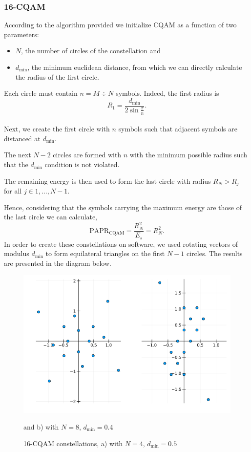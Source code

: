 \documentclass[11pt,a4paper,onecolumn,final]{article}
\newcommand{\dmin}{d_\text{min}}
\begin{document}
\subsubsection*{16-CQAM}
According to the algorithm provided \cite{cqam} we initialize CQAM as a function of two parameters: 
\begin{itemize}
    \item \(N\), the number of circles of the constellation and
    \item \(d_\text{min}\), the minimum euclidean distance, from which we can directly calculate the radius of the first circle. 
\end{itemize}
Each circle must contain \(n = M \div N \) symbols. Indeed, the first radius is 
\begin{equation}
    R_1 = \frac{d_\text{min} }{2\sin \frac{\pi}{ n}}.
\end{equation}\\ 
Next, we create the first circle with \(n \) symbols such that adjacent symbols are distanced at \(d_\text{min}\). 

The next \(N-2\) circles are formed with \(n\) with the minimum possible radius such that the \(d_\text{min}\) condition is not violated. 

The remaining energy is then used to form the last circle with radius \(R_N > R_j\) \\ for all \(j \in 1,\ldots , N-1\).

Hence, considering that the symbols carrying the maximum energy are those of the last circle we can calculate,  
\begin{equation}
    \text{PAPR}_\text{CQAM} = \frac{R_N^2}{E_s } = R_N^2. 
\end{equation}
In order to create these constellations on software, we used rotating vectors of modulus \(d_\text{min}\) to form equilateral triangles on the first \(N-1\) circles. The results are presented in the diagram below. 

\begin{figure}[h]
    \centering
    \includegraphics[scale=0.7]{16cqam_dual.png}
    \caption{16-CQAM constellations, a) with \(N=4\), \(\dmin = 0.5\)} and b) with \(N=8\), \(\dmin = 0.4\)
\end{figure}
\end{document}
